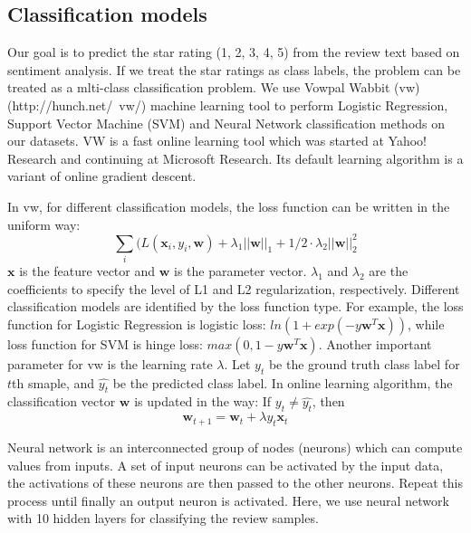 \subsection{Classification models}
Our goal is to predict the star rating (1, 2, 3, 4, 5) from the review text based on sentiment analysis. If we treat the star ratings as class labels, the problem can be treated as a mlti-class classification problem. We use Vowpal Wabbit (vw) (http://hunch.net/~vw/) machine learning tool to perform Logistic Regression, Support Vector Machine (SVM) and Neural Network classification methods on our datasets. VW is a fast online learning tool which was started at Yahoo! Research and continuing at Microsoft Research. Its default learning algorithm is a variant of online gradient descent.

In vw, for different classification models, the loss function can be written in the uniform way:\\
\begin{equation}
\sum_i(L(\textbf{x}_i,y_i,\textbf{w})+\lambda_1||\textbf{w}||_1+1/2\cdot\lambda_2||\textbf{w}||_2^2
\end{equation}
$\textbf{x}$ is the feature vector and $\textbf{w}$ is the parameter vector. $\lambda_1$ and $\lambda_2$ are the coefficients to specify the level of L1 and L2 regularization, respectively. Different classification models are identified by the loss function type. For example, the loss function for Logistic Regression is logistic loss: $ln(1+exp(-y\textbf{w}^T\textbf{x}))$, while loss function for SVM is hinge loss: $max(0,1-y\textbf{w}^T\textbf{x})$. Another important parameter for vw is the learning rate $\lambda$. Let $y_t$ be the ground truth class label for $t$th smaple, and $\hat{y_t}$ be the predicted class label. In online learning algorithm, the classification vector $\textbf{w}$ is updated in the way: If $y_t\neq\hat{y_t}$, then\\
\begin{equation}
\textbf{w}_{t+1}=\textbf{w}_t+\lambda y_t\textbf{x}_t
\end{equation}

Neural network is an interconnected group of nodes (neurons) which can compute values from inputs. A set of input neurons can be activated by the input data, the activations of these neurons are then passed to the other neurons. Repeat this process until finally an output neuron is activated. Here, we use neural network with 10 hidden layers for classifying the review samples.

